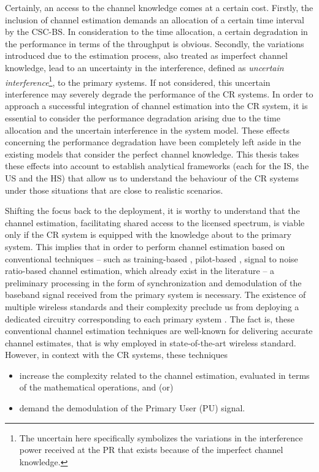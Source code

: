 Certainly, an access to the channel knowledge comes at a certain cost. Firstly, the inclusion of channel estimation demands an allocation of a certain time interval by the CSC-BS. In consideration to the time allocation, a certain degradation in the performance in terms of the throughput is obvious. Secondly, the variations introduced due to the estimation process, also treated as imperfect channel knowledge, lead to an uncertainty in the interference, defined as \textit{uncertain interference}\footnote{The uncertain here specifically symbolizes the variations in the interference power received at the PR that exists because of the imperfect channel knowledge.}, to the primary systems. If not considered, this uncertain interference may severely degrade the performance of the CR systems. In order to approach a successful integration of channel estimation into the CR system, it is essential to consider the performance degradation arising due to the time allocation and the uncertain interference in the system model. These effects concerning the performance degradation have been completely left aside in the existing models that consider the perfect channel knowledge. This thesis takes these effects into account to establish analytical frameworks (each for the IS, the US and the HS) that allow us to understand the behaviour of the CR systems under those situations that are close to realistic scenarios. %

Shifting the focus back to the deployment, it is worthy to understand that the channel estimation, facilitating shared access to the licensed spectrum, is viable only if the CR system is equipped with the knowledge about to the primary system. %
This implies that in order to perform channel estimation based on conventional techniques -- such as training-based \cite{Stoica03}, pilot-based \cite{Gifford05, Gifford08}, signal to noise ratio-based \cite{Chav11, Sharma13} channel estimation, which already exist in the literature -- a preliminary processing in the form of synchronization and demodulation of the baseband signal received from the primary system is necessary. The existence of multiple wireless standards and their complexity preclude us from deploying a dedicated circuitry corresponding to each primary system \cite{Ghasemi08_cm}. The fact is, these conventional channel estimation techniques are well-known for delivering accurate channel estimates, that is why employed in state-of-the-art wireless standard. However, in context with the CR systems, these techniques \begin{itemize} \item increase the complexity related to the channel estimation, evaluated in terms of the mathematical operations, and (or) \item demand the demodulation of the Primary User (PU) signal. \end{itemize} 

